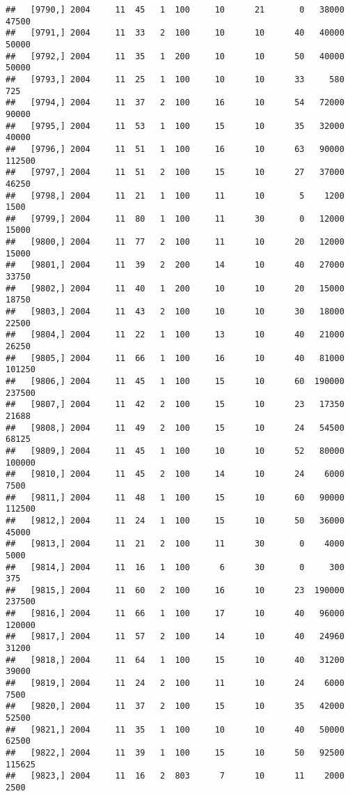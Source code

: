 \documentclass{article}\usepackage[]{graphicx}\usepackage[]{color}
\makeatletter
\newenvironment{kframe}{%
 \def\at@end@of@kframe{}%
 \ifinner\ifhmode%
  \def\at@end@of@kframe{\end{minipage}}%
  \begin{minipage}{\columnwidth}%
 \fi\fi%
 \def\FrameCommand##1{\hskip\@totalleftmargin \hskip-\fboxsep
 \colorbox{shadecolor}{##1}\hskip-\fboxsep
     \hskip-\linewidth \hskip-\@totalleftmargin \hskip\columnwidth}%
 \MakeFramed {\advance\hsize-\width
   \@totalleftmargin\z@ \linewidth\hsize
   \@setminipage}}%
 {\par\unskip\endMakeFramed%
 \at@end@of@kframe}
\newenvironment{knitrout}{}{} %
\makeatother
\begin{document}
\begin{knitrout}
\begin{kframe}
\begin{verbatim}
##   [9790,] 2004     11  45   1  100     10      21       0   38000   47500
##   [9791,] 2004     11  33   2  100     10      10      40   40000   50000
##   [9792,] 2004     11  35   1  200     10      10      50   40000   50000
##   [9793,] 2004     11  25   1  100     10      10      33     580     725
##   [9794,] 2004     11  37   2  100     16      10      54   72000   90000
##   [9795,] 2004     11  53   1  100     15      10      35   32000   40000
##   [9796,] 2004     11  51   1  100     16      10      63   90000  112500
##   [9797,] 2004     11  51   2  100     15      10      27   37000   46250
##   [9798,] 2004     11  21   1  100     11      10       5    1200    1500
##   [9799,] 2004     11  80   1  100     11      30       0   12000   15000
##   [9800,] 2004     11  77   2  100     11      10      20   12000   15000
##   [9801,] 2004     11  39   2  200     14      10      40   27000   33750
##   [9802,] 2004     11  40   1  200     10      10      20   15000   18750
##   [9803,] 2004     11  43   2  100     10      10      30   18000   22500
##   [9804,] 2004     11  22   1  100     13      10      40   21000   26250
##   [9805,] 2004     11  66   1  100     16      10      40   81000  101250
##   [9806,] 2004     11  45   1  100     15      10      60  190000  237500
##   [9807,] 2004     11  42   2  100     15      10      23   17350   21688
##   [9808,] 2004     11  49   2  100     15      10      24   54500   68125
##   [9809,] 2004     11  45   1  100     10      10      52   80000  100000
##   [9810,] 2004     11  45   2  100     14      10      24    6000    7500
##   [9811,] 2004     11  48   1  100     15      10      60   90000  112500
##   [9812,] 2004     11  24   1  100     15      10      50   36000   45000
##   [9813,] 2004     11  21   2  100     11      30       0    4000    5000
##   [9814,] 2004     11  16   1  100      6      30       0     300     375
##   [9815,] 2004     11  60   2  100     16      10      23  190000  237500
##   [9816,] 2004     11  66   1  100     17      10      40   96000  120000
##   [9817,] 2004     11  57   2  100     14      10      40   24960   31200
##   [9818,] 2004     11  64   1  100     15      10      40   31200   39000
##   [9819,] 2004     11  24   2  100     11      10      24    6000    7500
##   [9820,] 2004     11  37   2  100     15      10      35   42000   52500
##   [9821,] 2004     11  35   1  100     10      10      40   50000   62500
##   [9822,] 2004     11  39   1  100     15      10      50   92500  115625
##   [9823,] 2004     11  16   2  803      7      10      11    2000    2500

\end{verbatim}
\end{kframe}
\end{knitrout}
\end{document}
